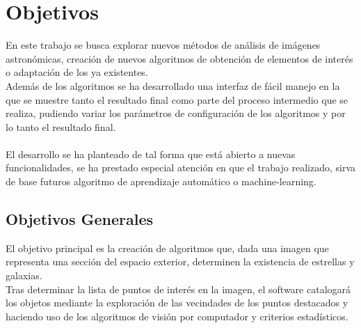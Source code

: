  

	\section{Objetivos}
	\label{sec:objetivos}
	En este trabajo se busca explorar nuevos métodos de análisis de imágenes astronómicas, creación de nuevos algoritmos de obtención de elementos de interés o adaptación de los ya existentes.\\
	Además de los algoritmos se ha desarrollado una interfaz de fácil manejo en la que se muestre tanto el resultado final como parte del proceso intermedio que se realiza, pudiendo variar los parámetros de configuración de los algoritmos y por lo tanto el resultado final.\\
	\\
	El desarrollo se ha planteado de tal forma que está abierto a nuevas funcionalidades, se ha prestado especial atención en que el trabajo realizado, sirva de base futuros algoritmo de aprendizaje automático o machine-learning.
	
	\subsection{Objetivos Generales}
	
	El objetivo principal es la creación de algoritmos que, dada una imagen que representa una sección del espacio exterior, determinen la existencia de estrellas y galaxias.
	\\
	Tras determinar la lista de puntos de interés en la imagen, el software catalogará los objetos mediante la exploración de las vecindades de los puntos destacados y haciendo uso de los algoritmos de visión por computador y criterios estadísticos.
	
